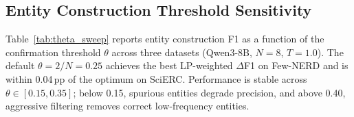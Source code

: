 \subsection{Entity Construction Threshold Sensitivity}
\label{app:theta_sweep}

Table~\ref{tab:theta_sweep} reports entity construction F1 as a function of the confirmation threshold $\theta$ across three datasets (Qwen3-8B, $N{=}8$, $T{=}1.0$). The default $\theta{=}2/N{=}0.25$ achieves the best LP-weighted $\Delta$F1 on Few-NERD and is within 0.04\,pp of the optimum on SciERC. Performance is stable across $\theta \in [0.15, 0.35]$; below 0.15, spurious entities degrade precision, and above 0.40, aggressive filtering removes correct low-frequency entities.

\begin{table}[h]
\caption{Entity construction threshold sensitivity ($N{=}8$, Qwen3-8B, $T{=}1.0$). $\Delta$: F1 difference vs.\ greedy in percentage points. Best $\Delta$ per dataset--weighting pair in \textbf{bold}.}
\label{tab:theta_sweep}
\centering
\small
{}
\end{table}
